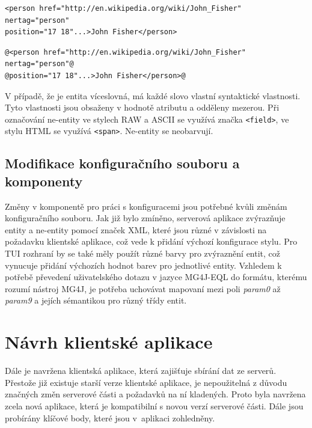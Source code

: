 \begin{lstlisting}[caption={Zvýraznění ve stylu RAW}, label={RAWHightLineLbl}, captionpos=b]
<person href="http://en.wikipedia.org/wiki/John_Fisher" nertag="person"
position="17 18"...>John Fisher</person>
\end{lstlisting}
 

 
 
\begin{lstlisting}[caption={Zvýraznění ve stylu ASCII}, style=base, label={ASCIIHightLineLbl}, captionpos=b]
@<person href="http://en.wikipedia.org/wiki/John_Fisher" nertag="person"@
@position="17 18"...>John Fisher</person>@
\end{lstlisting}
 


V případě, že je entita víceslovná, má každé slovo vlastní syntaktické vlastnosti. Tyto vlastnosti jsou obsaženy v hodnotě atributu a odděleny mezerou. Při označování ne-entity ve stylech RAW a ASCII se využívá značka \texttt{<field>}, ve stylu HTML se využívá \texttt{<span>}. Ne-entity se  neobarvují.



\subsection{Modifikace konfiguračního souboru a komponenty}
Změny v komponentě pro práci s konfiguracemi jsou potřebné kvůli změnám konfiguračního souboru. Jak již bylo zmíněno, serverová aplikace zvýrazňuje entity a ne-entity pomocí značek XML, které jsou různé v závislosti na požadavku klientské aplikace, což vede k přidání výchozí konfigurace stylu. Pro TUI rozhraní by se také měly použít různé barvy pro zvýraznění entit, což vynucuje přidání výchozích hodnot barev pro jednotlivé entity. Vzhledem k potřebě převedení uživatelského dotazu v jazyce MG4J-EQL do formátu, kterému rozumí nástroj MG4J, je potřeba uchovávat mapovaní mezi poli \emph{param0} až \emph{param9} a jejích sémantikou pro různý třídy entit.       


\section{Návrh klientské aplikace}
\label{ClientArchProposalLbl}
Dále je navržena klientská aplikace, která zajišťuje sbírání dat ze serverů. Přestože již existuje starší verze klientské aplikace, je nepoužitelná z důvodu značných změn serverové části a požadavků  na ní kladených. Proto byla navržena zcela nová aplikace, která je kompatibilní s novou verzí serverové části. Dále jsou probírány klíčové body, které jsou v~aplikaci zohledněny. 

